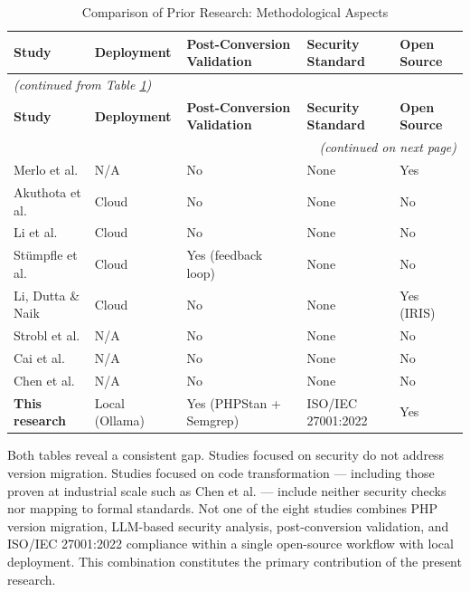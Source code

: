 \begin{longtable}{|l|p{2cm}|p{2.8cm}|p{2.5cm}|p{2cm}|}
\caption{Comparison of Prior Research: Methodological Aspects}
\label{tab:perbandingan-2} \\
\hline
\textbf{Study} & \textbf{Deployment} & \textbf{Post-Conversion Validation} & \textbf{Security Standard} & \textbf{Open Source} \\
\hline \hline
\endfirsthead
\multicolumn{5}{l}{\textit{(continued from Table \ref{tab:perbandingan-2})}} \\
\hline
\textbf{Study} & \textbf{Deployment} & \textbf{Post-Conversion Validation} & \textbf{Security Standard} & \textbf{Open Source} \\
\hline \hline
\endhead
\hline
\multicolumn{5}{r}{\textit{(continued on next page)}} \\
\endfoot
\hline
\endlastfoot
Merlo et al. \cite{merlo2007automated} & N/A & No & None & Yes \\
\hline
Akuthota et al. \cite{akuthota2023vulnerability} & Cloud & No & None & No \\
\hline
Li et al. \cite{li2025software} & Cloud & No & None & No \\
\hline
Stümpfle et al. \cite{stumpfle2025llm} & Cloud & Yes (feedback loop) & None & No \\
\hline
Li, Dutta \& Naik \cite{li2025iris} & Cloud & No & None & Yes (IRIS) \\
\hline
Strobl et al. \cite{strobl2020automated} & N/A & No & None & No \\
\hline
Cai et al. \cite{cai2015pattern} & N/A & No & None & No \\
\hline
Chen et al. \cite{chen2022ast} & N/A & No & None & No \\
\hline
\textbf{This research} & Local (Ollama) & Yes (PHPStan + Semgrep) & ISO/IEC 27001:2022 & Yes \\
\hline
\end{longtable}

Both tables reveal a consistent gap. Studies focused on security do not address version migration. Studies focused on code transformation — including those proven at industrial scale such as Chen et al. \cite{chen2022ast} — include neither security checks nor mapping to formal standards. Not one of the eight studies combines PHP version migration, LLM-based security analysis, post-conversion validation, and ISO/IEC 27001:2022 compliance within a single open-source workflow with local deployment. This combination constitutes the primary contribution of the present research.

